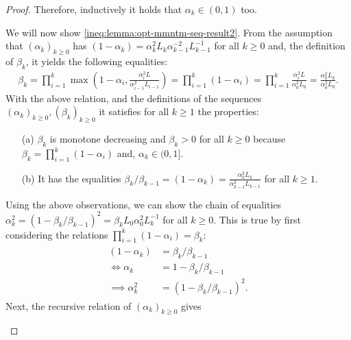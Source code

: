 \documentclass[12pt]{article}
\begin{document}
\begin{proof}
            Therefore, inductively it holds that $\alpha_k \in (0, 1)$ too. 
            \par
            We will now show \eqref{ineq:lemma:opt-mmntm-seq-result2}. 
            From the assumption that $(\alpha_k)_{k \ge 0}$ has $(1 - \alpha_k) = \alpha_k^2L_k \alpha_{k - 1}^{-2}L_{k - 1}^{-1}$ for all $k \ge 0$ and, the definition of $\beta_k$, it yields the following equalities: 
            \begin{align*}
                \beta_k = \prod_{i = 1}^k \max\left(
                    1 - \alpha_i, \frac{\alpha_i^2L}{\alpha_{i - 1}^2L_{i - 1}}
                \right) 
                = \prod_{i = 1}^k(1 - \alpha_i) 
                = \prod_{i = 1}^k \frac{\alpha_i^2L}{\alpha_0^2L_0} = \frac{\alpha_k^{2}L_k}{\alpha_0^2L_0}. 
            \end{align*}
            With the above relation, and the definitions of the sequences $(\alpha_k)_{k \ge 0}, (\beta_k)_{k\ge 0}$ it satisfies for all $k \ge 1$ the properties: 
            \begin{enumerate}[nosep]
                \item[(a)] $\beta_k$ is monotone decreasing and $\beta_k > 0$ for all $k \ge 0$ because $\beta_k = \prod_{i = 1}^{k} (1 - \alpha_i)$ and, $\alpha_k \in (0, 1]$. 
                \item[(b)] It has the equalities $\beta_k/\beta_{k - 1} = (1 - \alpha_k) = \frac{\alpha_k^2L_k}{\alpha_{k - 1}^2 L_{k - 1}}$ for all $k \ge 1$. 
            \end{enumerate}
            Using the above observations, we can show the chain of equalities $\alpha_k^{2} = (1 - \beta_k/\beta_{k - 1})^2 = \beta_kL_0\alpha_0^2L_k^{-1}$ for all $k \ge 0$. 
            This is true by first considering the relations $\prod_{i = 1}^k(1 - \alpha_i) = \beta_k$: 
            \begin{align}\label{eqn:opt-mmntm-seq-pitem1}\begin{split}
                (1 - \alpha_k) &= \beta_k/\beta_{k - 1}
                \\
                \iff 
                \alpha_k &= 1 - \beta_k / \beta_{k - 1}
                \\
                \implies 
                \alpha_k^2 &= (1 - \beta_k / \beta_{k - 1})^2. 
            \end{split}\end{align}
            Next, the recursive relation of $(\alpha_k)_{k \ge 0}$ gives
            \begin{align}\label{eqn:opt-mmntm-seq-pitem2}\begin{split}

\end{split}
\end{align}
\end{proof}
\end{document}

